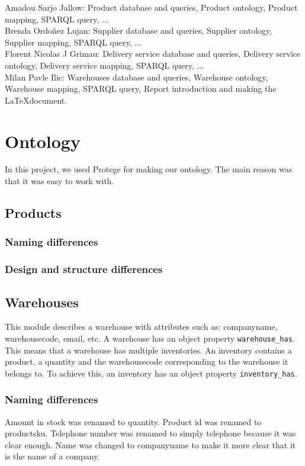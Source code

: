 \documentclass{article}
\begin{document}
\noindent Amadou Sarjo Jallow: Product database and queries, Product ontology, Product mapping, SPARQL query, ...
\\

\noindent Brenda Ordoñez Lujan: Supplier database and queries, Supplier ontology, Supplier mapping, SPARQL query, ...
\\

\noindent Florent Nicolas J Grimau: Delivery service database and queries, Delivery service ontology, Delivery service mapping, SPARQL query, ...
\\

\noindent Milan Pavle Ilic: Warehouses database and queries, Warehouse ontology, Warehouse mapping, SPARQL query, Report introduction and making the \LaTeX document.



\section{Ontology}
In this project, we used Protege for making our ontology. The main reason was that it was easy to work with.


\subsection{Products}
\subsubsection{Naming differences}
\subsubsection{Design and structure differences}



\subsection{Warehouses}
This module describes a warehouse with attributes such as: companyname, warehousecode, email, etc. A warehouse has an object property \texttt{warehouse\_has}. This means that a warehouse has multiple inventories. An inventory contains a product, a quantity and the warehousecode corresponding to the warehouse it belongs to. To achieve this, an inventory has an object property \texttt{inventory\_has}.


\subsubsection{Naming differences}
Amount in stock was renamed to quantity. Product id was renamed to productsku. Telephone number was renamed to simply telephone because it was clear enough. Name was changed to companyname to make it more clear that it is the name of a company.
\end{document}
